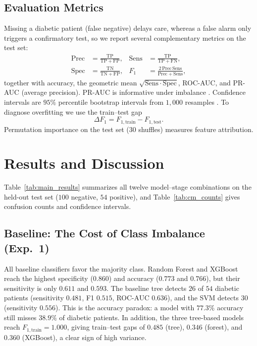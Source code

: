 \documentclass[journal]{IEEEtran}
\newcommand{\TP}{\mathrm{TP}}
\newcommand{\TN}{\mathrm{TN}}
\newcommand{\FP}{\mathrm{FP}}
\newcommand{\FN}{\mathrm{FN}}
\begin{document}
\subsection{Evaluation Metrics}
Missing a diabetic patient (false negative) delays care, whereas a false alarm only triggers a confirmatory test, so we report several complementary metrics on the test set:
\begin{align}
    \mathrm{Prec} &= \frac{\TP}{\TP + \FP}, & \mathrm{Sens} &= \frac{\TP}{\TP + \FN}, \\
    \mathrm{Spec} &= \frac{\TN}{\TN + \FP}, & F_1 &= \frac{2\,\mathrm{Prec}\,\mathrm{Sens}}{\mathrm{Prec} + \mathrm{Sens}},
\end{align}
together with accuracy, the geometric mean $\sqrt{\mathrm{Sens}\cdot\mathrm{Spec}}$, ROC-AUC, and PR-AUC (average precision). PR-AUC is informative under imbalance \cite{saito2015precision}. Confidence intervals are $95\%$ percentile bootstrap intervals from $1{,}000$ resamples \cite{efron1993bootstrap}. To diagnose overfitting we use the train--test gap
\begin{equation}
    \Delta F_1 = F_{1,\text{train}} - F_{1,\text{test}}.
\end{equation}
Permutation importance \cite{altmann2010permutation} on the test set (30 shuffles) measures feature attribution.

\section{Results and Discussion}\label{sec:results}
Table~\ref{tab:main_results} summarizes all twelve model--stage combinations on the held-out test set ($100$ negative, $54$ positive), and Table~\ref{tab:cm_counts} gives confusion counts and confidence intervals.

\subsection{Baseline: The Cost of Class Imbalance (Exp.~1)}
All baseline classifiers favor the majority class. Random Forest and XGBoost reach the highest specificity ($0.860$) and accuracy ($0.773$ and $0.766$), but their sensitivity is only $0.611$ and $0.593$. The baseline tree detects $26$ of $54$ diabetic patients (sensitivity $0.481$, F1 $0.515$, ROC-AUC $0.636$), and the SVM detects $30$ (sensitivity $0.556$). This is the accuracy paradox: a model with $77.3\%$ accuracy still misses $38.9\%$ of diabetic patients. In addition, the three tree-based models reach $F_{1,\text{train}} = 1.000$, giving train--test gaps of $0.485$ (tree), $0.346$ (forest), and $0.360$ (XGBoost), a clear sign of high variance.
\end{document}

